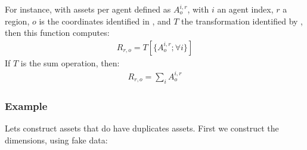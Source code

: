 \documentclass[letterpaper,10pt,english]{sphinxmanual}
\begin{document}
\begin{fulllineitems}
For instance, with assets per agent defined as \(A^{i, r}_o\), with \(i\) an
agent index, \(r\) a region, \(o\) is the coordinates identified in
, and \(T\) the transformation identified by , then this
function computes:
\begin{equation*}
\begin{split}R_{r, o} = T[\{A^{i, r}_o; \forall i\}]\end{split}
\end{equation*}
If \(T\) is the sum operation, then:
\begin{equation*}
\begin{split}R_{r, o} = \sum_i  A^{i, r}_o\end{split}
\end{equation*}\subsubsection*{Example}

Lets construct assets that do have duplicates assets. First we construct the
dimensions, using fake data:


\end{fulllineitems}
\end{document}
